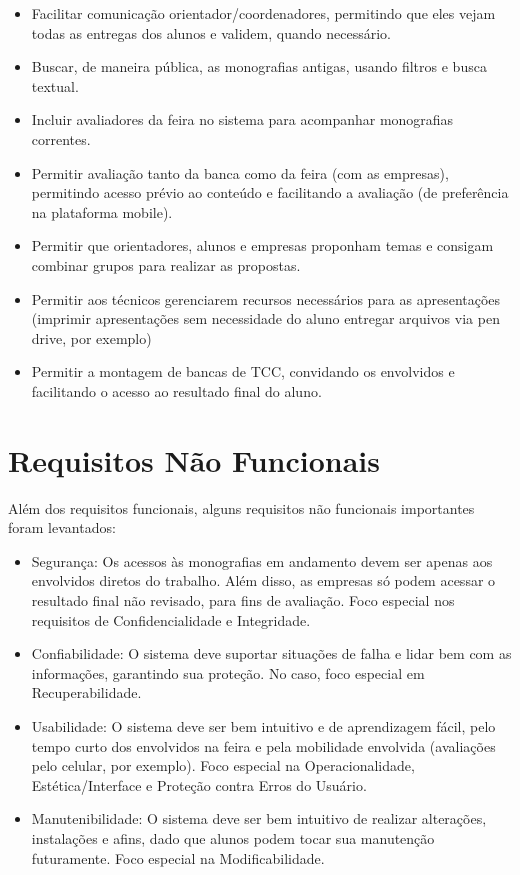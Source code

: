 \begin{itemize}
    \item Facilitar comunicação orientador/coordenadores, permitindo que eles vejam todas as entregas dos alunos e validem, quando necessário.
    \item Buscar, de maneira pública, as monografias antigas, usando filtros e busca textual.
    \item Incluir avaliadores da feira no sistema para acompanhar monografias correntes.
    \item Permitir avaliação tanto da banca como da feira (com as empresas), permitindo acesso prévio ao conteúdo e facilitando a avaliação (de preferência na plataforma mobile).
    \item Permitir que orientadores, alunos e empresas proponham temas e consigam combinar grupos para realizar as propostas.
    \item Permitir aos técnicos gerenciarem recursos necessários para as apresentações (imprimir apresentações sem necessidade do aluno entregar arquivos via pen drive, por exemplo)
    \item Permitir a montagem de bancas de TCC, convidando os envolvidos e facilitando o acesso ao resultado final do aluno.
\end{itemize}
  
\section{Requisitos Não Funcionais}
Além dos requisitos funcionais, alguns requisitos não funcionais importantes foram levantados:

\begin{itemize}
    \item Segurança: Os acessos às monografias em andamento devem ser apenas aos envolvidos diretos do trabalho. Além disso, as empresas só podem acessar o resultado final não revisado, para fins de avaliação. Foco especial nos requisitos de Confidencialidade e Integridade.
    \item Confiabilidade: O sistema deve suportar situações de falha e lidar bem com as informações, garantindo sua proteção. No caso, foco especial em Recuperabilidade.
    \item Usabilidade: O sistema deve ser bem intuitivo e de aprendizagem fácil, pelo tempo curto dos envolvidos na feira e pela mobilidade envolvida (avaliações pelo celular, por exemplo). Foco especial na Operacionalidade, Estética/Interface e Proteção contra Erros do Usuário.
    \item Manutenibilidade: O sistema deve ser bem intuitivo de realizar alterações, instalações e afins, dado que alunos podem tocar sua manutenção futuramente. Foco especial na Modificabilidade.
\end{itemize}